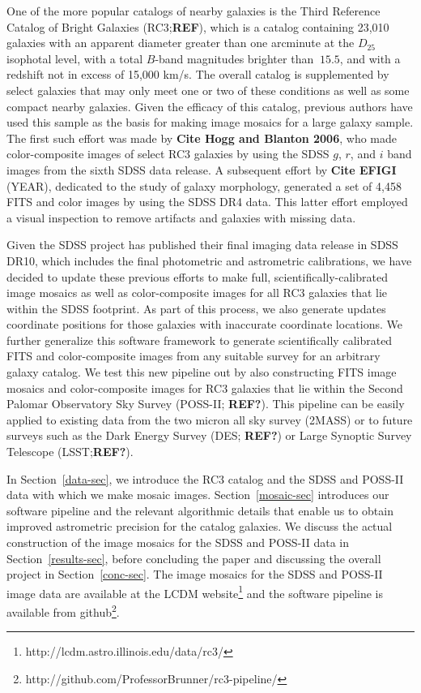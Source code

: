 \documentclass[authoryear, 12pt,5p, times]{elsarticle}
\begin{document}
One of the more popular catalogs of nearby galaxies is the Third Reference Catalog of Bright Galaxies  (RC3;\textbf{REF}), which is a catalog containing 23,010 galaxies with an apparent diameter greater than one arcminute at the $D_{25}$ isophotal level, with a total $B$-band magnitudes brighter than $~15.5$, and with a redshift not in excess of 15,000 km/s. The overall catalog is supplemented by select galaxies that may only meet one or two of these conditions as well as some compact nearby galaxies. Given the efficacy of this catalog, previous authors have used this sample as the basis for making image mosaics for a large galaxy sample. The first such effort was made by \textbf{Cite Hogg and Blanton 2006}, who made color-composite images of select RC3 galaxies by using the SDSS $g$, $r$, and $i$ band images from the sixth SDSS data release. A subsequent effort by \textbf{Cite EFIGI} (YEAR), dedicated to the study of galaxy morphology, generated a set of 4,458 FITS and color images by using the SDSS DR4 data. This latter effort employed a visual inspection to remove artifacts and galaxies with missing data.

Given the SDSS project has published their final imaging data release in SDSS DR10, which includes the final photometric and astrometric calibrations, we have decided to update these previous efforts to make full, scientifically-calibrated image mosaics as well as color-composite images for all RC3 galaxies that lie within the SDSS footprint. As part of this process, we also generate updates coordinate positions for those galaxies with inaccurate coordinate locations. We further generalize this software framework to generate scientifically calibrated FITS and color-composite images from any suitable survey for an arbitrary galaxy catalog. We test this new pipeline out by also constructing FITS image mosaics and color-composite images for RC3 galaxies that lie within the Second Palomar Observatory Sky Survey (POSS-II; \textbf{REF?}). This pipeline can be easily applied to existing data from the two micron all sky survey (2MASS) or to future surveys such as the Dark Energy Survey (DES; \textbf{REF?}) or Large Synoptic Survey Telescope (LSST;\textbf{REF?}).

In Section~\ref{data-sec}, we introduce the RC3 catalog and the SDSS and POSS-II data with which we make mosaic images. Section~\ref{mosaic-sec} introduces our software pipeline and the relevant algorithmic details that enable us to obtain improved astrometric precision for the catalog galaxies. We discuss the actual construction of the image mosaics for the SDSS and POSS-II data in Section~\ref{results-sec}, before concluding the paper and discussing the overall project in Section~\ref{conc-sec}. The image mosaics for the SDSS and POSS-II image data are available at the LCDM website\footnote{http://lcdm.astro.illinois.edu/data/rc3/} and the software pipeline is available from github\footnote{http://github.com/ProfessorBrunner/rc3-pipeline/}.
\end{document}
